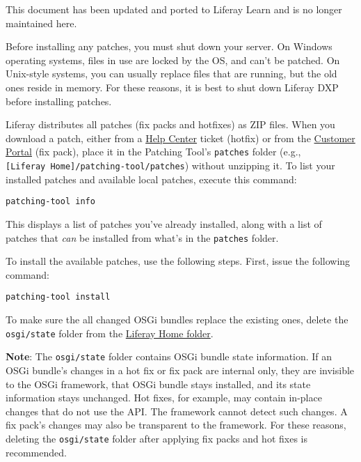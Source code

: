{This document has been updated and ported to Liferay Learn and is no
longer maintained here.}

Before installing any patches, you must shut down your server. On
Windows operating systems, files in use are locked by the OS, and can't
be patched. On Unix-style systems, you can usually replace files that
are running, but the old ones reside in memory. For these reasons, it is
best to shut down Liferay DXP before installing patches.

Liferay distributes all patches (fix packs and hotfixes) as ZIP files.
When you download a patch, either from a
\href{https://help.liferay.com/hc}{Help Center} ticket (hotfix) or from
the \href{https://customer.liferay.com/downloads}{Customer Portal} (fix
pack), place it in the Patching Tool's \texttt{patches} folder (e.g.,
\texttt{{[}Liferay\ Home{]}/patching-tool/patches}) without unzipping
it. To list your installed patches and available local patches, execute
this command:

\begin{verbatim}
patching-tool info
\end{verbatim}

This displays a list of patches you've already installed, along with a
list of patches that \emph{can} be installed from what's in the
\texttt{patches} folder.

To install the available patches, use the following steps. First, issue
the following command:

\begin{verbatim}
patching-tool install
\end{verbatim}

To make sure the all changed OSGi bundles replace the existing ones,
delete the \texttt{osgi/state} folder from the
\href{/docs/7-2/deploy/-/knowledge_base/d/liferay-home}{Liferay Home
folder}.

\noindent\hrulefill

\textbf{Note}: The \texttt{osgi/state} folder contains OSGi bundle state
information. If an OSGi bundle's changes in a hot fix or fix pack are
internal only, they are invisible to the OSGi framework, that OSGi
bundle stays installed, and its state information stays unchanged. Hot
fixes, for example, may contain in-place changes that do not use the
API. The framework cannot detect such changes. A fix pack's changes may
also be transparent to the framework. For these reasons, deleting the
\texttt{osgi/state} folder after applying fix packs and hot fixes is
recommended.

